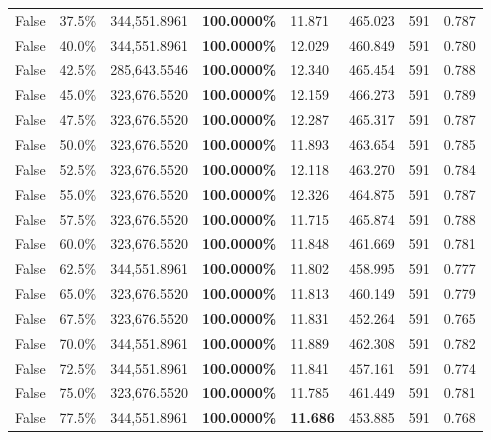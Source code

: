 \begin{table}[H]
\begin{tabular}{lllrllll}
\cline{1-8}
False & 37.5\% & 344,551.8961 & \bfseries \color{red} 100.0000\% & 11.871 & 465.023 & 591 & 0.787 \\
\cline{1-8}
False & 40.0\% & 344,551.8961 & \bfseries \color{red} 100.0000\% & 12.029 & 460.849 & 591 & 0.780 \\
\cline{1-8}
False & 42.5\% & \color{red} 285,643.5546 & \bfseries \color{red} 100.0000\% & 12.340 & 465.454 & 591 & 0.788 \\
\cline{1-8}
False & 45.0\% & 323,676.5520 & \bfseries \color{red} 100.0000\% & 12.159 & 466.273 & 591 & 0.789 \\
\cline{1-8}
False & 47.5\% & 323,676.5520 & \bfseries \color{red} 100.0000\% & 12.287 & 465.317 & 591 & 0.787 \\
\cline{1-8}
False & 50.0\% & 323,676.5520 & \bfseries \color{red} 100.0000\% & 11.893 & 463.654 & 591 & 0.785 \\
\cline{1-8}
False & 52.5\% & 323,676.5520 & \bfseries \color{red} 100.0000\% & 12.118 & 463.270 & 591 & 0.784 \\
\cline{1-8}
False & 55.0\% & 323,676.5520 & \bfseries \color{red} 100.0000\% & 12.326 & 464.875 & 591 & 0.787 \\
\cline{1-8}
False & 57.5\% & 323,676.5520 & \bfseries \color{red} 100.0000\% & 11.715 & 465.874 & 591 & 0.788 \\
\cline{1-8}
False & 60.0\% & 323,676.5520 & \bfseries \color{red} 100.0000\% & 11.848 & 461.669 & 591 & 0.781 \\
\cline{1-8}
False & 62.5\% & 344,551.8961 & \bfseries \color{red} 100.0000\% & 11.802 & 458.995 & 591 & 0.777 \\
\cline{1-8}
False & 65.0\% & 323,676.5520 & \bfseries \color{red} 100.0000\% & 11.813 & 460.149 & 591 & 0.779 \\
\cline{1-8}
False & 67.5\% & 323,676.5520 & \bfseries \color{red} 100.0000\% & 11.831 & 452.264 & 591 & 0.765 \\
\cline{1-8}
False & 70.0\% & 344,551.8961 & \bfseries \color{red} 100.0000\% & 11.889 & 462.308 & 591 & 0.782 \\
\cline{1-8}
False & 72.5\% & 344,551.8961 & \bfseries \color{red} 100.0000\% & 11.841 & 457.161 & 591 & 0.774 \\
\cline{1-8}
False & 75.0\% & 323,676.5520 & \bfseries \color{red} 100.0000\% & 11.785 & 461.449 & 591 & 0.781 \\
\cline{1-8}
False & 77.5\% & 344,551.8961 & \bfseries \color{red} 100.0000\% & \bfseries \color{red} 11.686 & 453.885 & 591 & 0.768 \\

\end{tabular}
\end{table}
